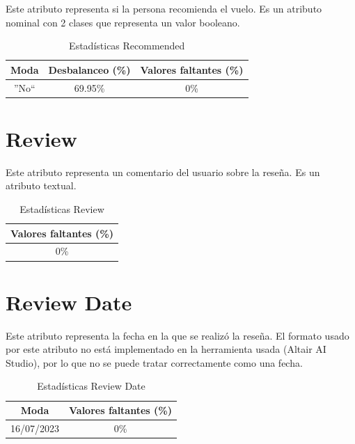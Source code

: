 \documentclass[12pt]{report} %
\begin{document}
    Este atributo representa si la persona recomienda el vuelo. Es un atributo nominal
    con 2 clases que representa un valor booleano.

    \begin{table}[H]
        \begin{center}
            \begin{tabular}{ @{}ccc@{} }
                \toprule
                Moda & Desbalanceo (\%) & Valores faltantes (\%) \\
                \midrule
                ''No`` & 69.95\% & 0\% \\
                \bottomrule
            \end{tabular}
            \caption{Estadísticas Recommended}
        \end{center}
    \end{table}

    \section{Review}

    Este atributo representa un comentario del usuario sobre la reseña. Es un atributo
    textual.

    \begin{table}[H]
        \begin{center}
            \begin{tabular}{ @{}c@{} }
                \toprule
                Valores faltantes (\%) \\
                \midrule
                0\% \\
                \bottomrule
            \end{tabular}
            \caption{Estadísticas Review}
        \end{center}
    \end{table}

    \section{Review Date}

    Este atributo representa la fecha en la que se realizó la reseña. El formato
    usado por este atributo no está implementado en la herramienta usada (Altair AI Studio),
    por lo que no se puede tratar correctamente como una fecha.

    \begin{table}[H]
        \begin{center}
            \begin{tabular}{ @{}cc@{} }
                \toprule
                Moda & Valores faltantes (\%) \\
                \midrule
                16/07/2023 & 0\% \\
                \bottomrule
            \end{tabular}
            \caption{Estadísticas Review Date}
        \end{center}
    \end{table}
\end{document}

